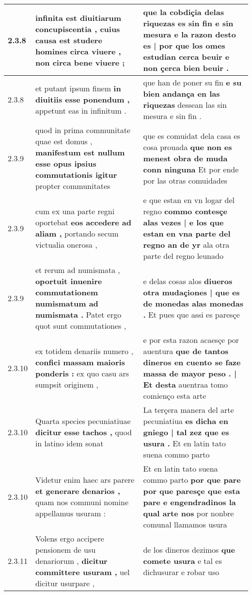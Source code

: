 \begin{tabular}{|p{1cm}|p{6.5cm}|p{6.5cm}|}
2.3.8 & infinita est diuitiarum concupiscentia , \textbf{ cuius causa est studere homines circa viuere , } non circa bene viuere ; & que la cobdiçia delas riquezas es sin fin e sin mesura \textbf{ e la razon desto es | por que los omes estudian cerca beuir } e non çerca bien beuir . \\\hline
2.3.8 & et putant ipsum finem \textbf{ in diuitiis esse ponendum , } appetunt eas in infinitum . & que han de poner su fin \textbf{ e su bien andança en las riquezas } dessean las sin mesura e sin fin . \\\hline
2.3.9 & quod in prima communitate quae est domus , \textbf{ manifestum est nullum esse opus ipsius commutationis igitur } propter communitates & que es comuidat dela casa es cosa prouada \textbf{ que non es menest obra de muda conn ninguna } Et por ende por las otras comuidades \\\hline
2.3.9 & cum ex una parte regni oportebat \textbf{ eos accedere ad aliam , } portando secum victualia onerosa , & e que estan en vn logar del regno \textbf{ commo contesçe alas vezes | e los que estan en vna parte del regno an de yr } ala otra parte del regno leunado \\\hline
2.3.9 & et rerum ad numismata , \textbf{ oportuit inuenire commutationem numismatum ad numismata . } Patet ergo quot sunt commutationes , & e delas cosas alos \textbf{ diueros otra mudaçiones | que es de monedas alas monedas . } Et pues que assi es paresçe \\\hline
2.3.10 & ex totidem denariis numero , \textbf{ confici massam maioris ponderis : } ex quo casu ars sumpsit originem , & e por esta razon acaesçe por auentura \textbf{ que de tantos dineros en cuento se faze massa de mayor peso . | Et desta } auentraa tomo comienço esta arte \\\hline
2.3.10 & Quarta species pecuniatiuae \textbf{ dicitur esse tachos , } quod in latino idem sonat & La terçera manera del arte pecuniatiua \textbf{ es dicha en gniego | tal zez que es usura . } Et en latin tato suena commo parto \\\hline
2.3.10 & Videtur enim haec ars parere \textbf{ et generare denarios , } quam nos communi nomine appellamus usuram : & Et en latin tato suena commo parto \textbf{ por que pare por que paresçe que esta pare e engendradinos la qual arte nos } por nonbre comunal llamamos usura \\\hline
2.3.11 & Volens ergo accipere pensionem de usu denariorum , \textbf{ dicitur committere usuram , } uel dicitur usurpare , & de los dineros dezimos \textbf{ que comete usura } e tal es dichusurar e robar uso \\\hline

\end{tabular}
